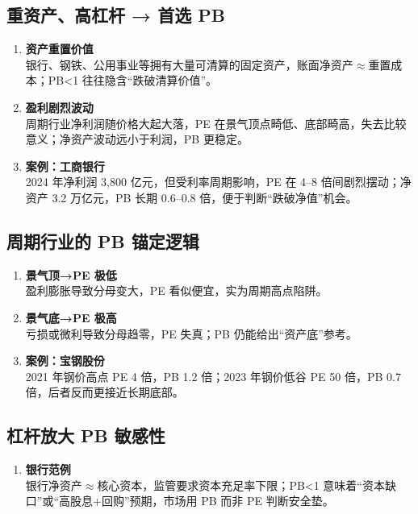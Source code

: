 \subsection{重资产、高杠杆 → 首选 PB}
\begin{enumerate}[leftmargin=*, nosep]
    \item \textbf{资产重置价值}  \\
    银行、钢铁、公用事业等拥有大量可清算的固定资产，账面净资产$\approx$重置成本；PB<1 往往隐含“跌破清算价值”。
    \item \textbf{盈利剧烈波动}  \\
    周期行业净利润随价格大起大落，PE 在景气顶点畸低、底部畸高，失去比较意义；净资产波动远小于利润，PB 更稳定。
    \item \textbf{案例：工商银行}  \\
    2024 年净利润 3,800 亿元，但受利率周期影响，PE 在 4–8 倍间剧烈摆动；净资产 3.2 万亿元，PB 长期 0.6–0.8 倍，便于判断“跌破净值”机会。
\end{enumerate}

\subsection{周期行业的 PB 锚定逻辑}
\begin{enumerate}[leftmargin=*, nosep]
    \item \textbf{景气顶→PE 极低}  \\
    {\color{red}盈利膨胀导致分母变大，PE 看似便宜，实为周期高点陷阱。}
    \item \textbf{景气底→PE 极高}  \\
    {\color{red}亏损或微利导致分母趋零，PE 失真；PB 仍能给出“资产底”参考。}
    \item \textbf{案例：宝钢股份}  \\
    2021 年钢价高点 PE 4 倍，PB 1.2 倍；2023 年钢价低谷 PE 50 倍，PB 0.7 倍，后者反而更接近长期底部。
\end{enumerate}

\subsection{杠杆放大 PB 敏感性}
\begin{enumerate}[leftmargin=*, nosep]
    \item \textbf{银行范例}  \\
    银行净资产$\approx$核心资本，监管要求资本充足率下限；{\color{red}PB<1 意味着“资本缺口”或“高股息+回购”预期，市场用 PB 而非 PE 判断安全垫。}
\end{enumerate}

